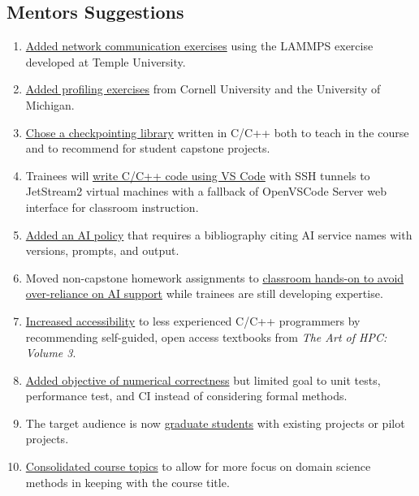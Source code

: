 \documentclass[
portrait,
custom
]{sciposter}
\begin{document}
\begin{multicols}{2}
  \section*{Mentors Suggestions}
  \begin{multicols}{2}
    \begin{enumerate}
    \item \ul{Added network communication exercises} %
      using the LAMMPS exercise developed at Temple University.
    \item \ul{Added profiling exercises} %
      from Cornell University %
      and the University of Michigan.
    \item \ul{Chose a checkpointing library} %
      written in C/C++ %
      both to teach in the course %
      and to recommend for student capstone projects.
    \item Trainees will \ul{write C/C++ code using VS Code} %
      with SSH tunnels to JetStream2 virtual machines %
      with a fallback of OpenVSCode Server web interface %
      for classroom instruction.
    \item \ul{Added an AI policy} %
      that requires a bibliography %
      citing AI service names with versions, prompts, and output.
    \item Moved non-capstone homework assignments to %
      \ul{classroom hands-on to avoid over-reliance on AI support} %
      while trainees are still developing expertise.
    \item \ul{Increased accessibility} %
      to less experienced C/C++ programmers %
      by recommending self-guided, open access textbooks %
      from \emph{The Art of HPC: Volume 3}.
    \item \ul{Added objective of numerical correctness} %
      but limited goal to unit tests, performance test, and CI %
      instead of considering formal methods.
    \item The target audience is now \ul{graduate students} %
      with existing projects or pilot projects.
    \item \ul{Consolidated course topics} %
      to allow for more focus on domain science methods %
      in keeping with the course title.
    \end{enumerate}
  \end{multicols}


\end{multicols}
\end{document}
